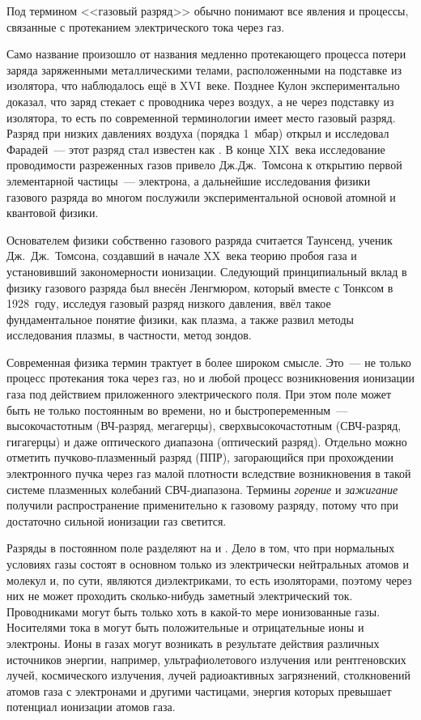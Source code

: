 

Под термином <<газовый разряд>> обычно понимают все явления и процессы,
связанные с протеканием электрического тока
через газ.

Само название  произошло от названия медленно протекающего
процесса потери заряда заряженными металлическими
телами, расположенными на подставке из изолятора, что наблюдалось ещё в
XVI~веке. Позднее Кулон экспериментально
доказал, что заряд стекает с проводника через воздух, а не через подставку из
изолятора, то есть по современной
терминологии имеет место газовый разряд. Разряд при низких давлениях воздуха
(порядка 1~мбар) открыл и исследовал
Фарадей~--- этот разряд стал известен как . В конце XIX~века
исследование проводимости разреженных газов
привело Дж.Дж.~Томсона к открытию первой элементарной частицы~--- электрона, а
дальнейшие исследования физики газового
разряда во многом послужили экспериментальной основой атомной и квантовой
физики.

Основателем физики собственно газового разряда считается Таунсенд, ученик
Дж.~Дж.~Томсона, создавший в начале XX~века
теорию пробоя газа и установивший закономерности ионизации. Следующий
принципиальный вклад в физику газового разряда был
внесён Ленгмюром, который вместе с Тонксом в 1928~году, исследуя газовый разряд
низкого давления, ввёл такое
фундаментальное понятие физики, как плазма,
а также развил методы исследования плазмы, в частности, метод зондов.

Современная физика термин  трактует в более широком
смысле. Это~--- не только процесс протекания
тока через газ, но и любой процесс возникновения ионизации газа под действием
приложенного электрического поля. При этом
поле может быть не только постоянным во времени, но и быстропеременным~---
высокочастотным (ВЧ-разряд, мегагерцы),
сверхвысокочастотным (СВЧ-разряд, гигагерцы) и даже оптического диапазона
(оптический разряд). Отдельно можно отметить пучково-плазменный разряд (ППР),
загорающийся при прохождении электронного пучка через газ малой плотности
вследствие возникновения в такой системе плазменных колебаний СВЧ-диапазона.
Термины \emph{горение} и \emph{зажигание} получили распространение
применительно к газовому разряду, потому что при достаточно сильной ионизации
газ светится.

Разряды в постоянном поле разделяют на  и
. Дело в том, что при нормальных
условиях газы состоят в основном только из электрически нейтральных атомов и
молекул и, по сути, являются диэлектриками,
то есть изоляторами, поэтому через них не может проходить сколько-нибудь
заметный электрический ток. Проводниками могут
быть только хоть в какой-то мере ионизованные газы.
Носителями тока в могут быть положительные и отрицательные ионы и электроны.
Ионы в газах могут возникать в результате действия различных
источников энергии, например, ультрафиолетового излучения или рентгеновских лучей,
космического излучения, лучей радиоактивных загрязнений,
столкновений атомов газа с электронами и другими частицами, энергия
которых превышает потенциал ионизации атомов газа.

